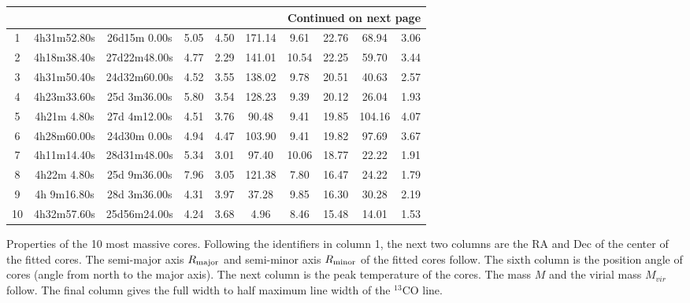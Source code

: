 \documentclass[12pt,preprint]{aastex}
\begin{document}
\begin{longtable}[htb]{|c|c|c|c|c|c|c|c|c|c|}
\endhead

\hline \multicolumn{10}{|r|}{{Continued on next page}} \\ \hline

\endfoot


\endlastfoot
\hline\hline

   1 &  4h31m52.80s & 26d15m 0.00s &   5.05 &   4.50 & 171.14 &   9.61 &  22.76 &  68.94 &   3.06 \\
   2 &  4h18m38.40s & 27d22m48.00s &   4.77 &   2.29 & 141.01 &  10.54 &  22.25 &  59.70 &   3.44 \\
   3 &  4h31m50.40s & 24d32m60.00s &   4.52 &   3.55 & 138.02 &   9.78 &  20.51 &  40.63 &   2.57 \\
   4 &  4h23m33.60s & 25d 3m36.00s &   5.80 &   3.54 & 128.23 &   9.39 &  20.12 &  26.04 &   1.93 \\
   5 &  4h21m 4.80s & 27d 4m12.00s &   4.51 &   3.76 &  90.48 &   9.41 &  19.85 & 104.16 &   4.07 \\
   6 &  4h28m60.00s & 24d30m 0.00s &   4.94 &   4.47 & 103.90 &   9.41 &  19.82 &  97.69 &   3.67 \\
   7 &  4h11m14.40s & 28d31m48.00s &   5.34 &   3.01 &  97.40 &  10.06 &  18.77 &  22.22 &   1.91 \\
   8 &  4h22m 4.80s & 25d 9m36.00s &   7.96 &   3.05 & 121.38 &   7.80 &  16.47 &  24.22 &   1.79 \\
   9 &  4h 9m16.80s & 28d 3m36.00s &   4.31 &   3.97 &  37.28 &   9.85 &  16.30 &  30.28 &   2.19 \\
  10 &  4h32m57.60s & 25d56m24.00s &   4.24 &   3.68 &   4.96 &   8.46 &  15.48 &  14.01 &   1.53 \\
\hline
\end{longtable}
{\footnotesize Properties of the 10 most massive cores. Following the identifiers in column 1, the next two columns are the RA and Dec of the center of the fitted cores.
The semi-major axis $R_{\rm major}$ and semi-minor axis $R_{\rm minor}$ of the fitted cores follow. The sixth
column is the position angle of cores (angle from north to the major axis). The next column is the peak temperature of the cores. The mass $M$ and the virial mass $M_{vir}$ follow. The final column gives the full width to half maximum line width of the $^{13}$CO line.
}
\end{document}
